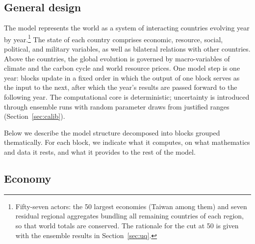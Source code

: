 \documentclass[a4paper,fleqn]{cas-sc}
\newcommand{\response}[1]{\medskip\noindent\textcolor{blue}{\small\itshape [Addressed: #1]}\medskip}
\begin{document}

\subsection{General design}

The model represents the world as a system of interacting countries evolving year by
year.\footnote{Fifty-seven actors: the 50 largest economies (Taiwan among them) and seven residual
regional aggregates bundling all remaining countries of each region, so that world totals are
conserved. The rationale for the cut at 50 is given with the ensemble results in
Section~\ref{sec:uq}.} The state of
each country comprises economic, resource, social, political, and military variables, as well as
bilateral relations with other countries. Above the countries, the global evolution is governed by macro-variables of climate and the carbon cycle and world resource prices. One model step is one year: blocks update in a fixed order in which the output of one block serves as the input to the next, after which the year's results are passed forward to the following year. The computational core is deterministic;
uncertainty is introduced through ensemble runs with random parameter draws from justified ranges
(Section~\ref{sec:calib}).

Below we describe the model structure decomposed into blocks grouped thematically. For each block, we indicate what it computes, on what mathematics and data it rests, and what it provides to the rest of the model.

\subsection{Economy}
\end{document}
